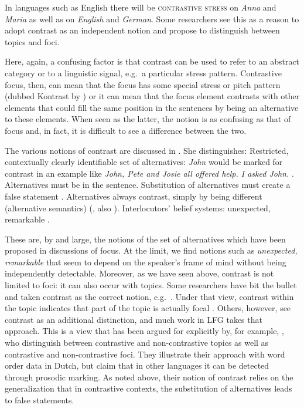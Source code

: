 \documentclass[output=paper,hidelinks]{langscibook}
\begin{document}
In languages such as English there will be \textsc{contrastive stress} on \textit{Anna} and \textit{Maria} as well as on \textit{English} and \textit{German}. Some researchers see this as a reason to adopt contrast as an independent notion and propose to distinguish between  \textsc{} topics and foci.
                                                   
Here, again, a confusing factor is that contrast can be used to refer to an abstract category or to a linguistic signal, e.g.\ a particular stress pattern. Contrastive focus, then, can mean that the focus has some special stress or pitch pattern (dubbed Kontrast by \citealt{VallduviandVilkuna1998}) or it can mean that the focus element contrasts with other elements that could fill the same position in the sentences by being an alternative to these elements. When seen as the latter, the notion is as confusing as that of focus and, in fact, it is difficult to see a difference between the two. 

The various notions of contrast are discussed in \citet{repp2016}. She distinguishes:
\ea\label{contrastypes}
\ea Restricted, contextually clearly identifiable set of alternatives: \emph{John} would be marked for contrast  in an example like \emph{John, Pete and Josie all offered help. I asked John.} \citep{kiss1998}.
\ex Alternatives must be in the sentence. 
\ex Substitution of alternatives must create a false statement \citep{neelemanandvermeulen2012}. 
\ex Alternatives always contrast, simply by being different (alternative semantics) (\citealt{VallduviandVilkuna1998}, also \citealt{Krifka}).
\ex Interlocutors' belief systems: unexpected, remarkable \citep{frey06}.
\z 
\z

These are, by and large, the notions of the set of alternatives which have been proposed in discussions of focus.  At the limit, we find notions such as \textit{unexpected, remarkable} that seem to depend on the speaker's frame of mind without being independently detectable. Moreover, as we have seen above, contrast is not limited to foci:  it can also occur with topics. Some researchers have bit the bullet and taken contrast as the correct notion, e.g.\ \citet{KS}. Under that view, contrast within the topic indicates that part of the topic is actually focal \citep{Krifka,Erteschik-Shir2007}. Others, however, see contrast as an additional distinction,  and much work in LFG takes that approach. This is a view that has been argued for explicitly by, for example, \citet{neelemanandvermeulen2012}, who distinguish between contrastive and non-contrastive topics as well as contrastive and non-contrastive foci. They illustrate their approach with word order data in Dutch, but claim that in other languages it can be detected through prosodic marking. As noted above, their notion of contrast relies on the generalization that in contrastive contexts, the substitution of alternatives leads to false statements. 
\end{document}
